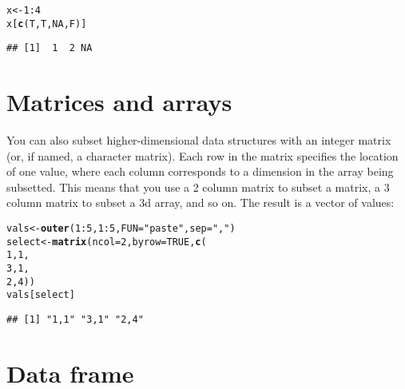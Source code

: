 \documentclass{article}\usepackage[]{graphicx}\usepackage[]{color}
\makeatletter
\newcommand{\hlnum}[1]{\textcolor[rgb]{0.686,0.059,0.569}{#1}}%
\newcommand{\hlstr}[1]{\textcolor[rgb]{0.192,0.494,0.8}{#1}}%
\newcommand{\hlopt}[1]{\textcolor[rgb]{0,0,0}{#1}}%
\newcommand{\hlstd}[1]{\textcolor[rgb]{0.345,0.345,0.345}{#1}}%
\newcommand{\hlkwb}[1]{\textcolor[rgb]{0.69,0.353,0.396}{#1}}%
\newcommand{\hlkwc}[1]{\textcolor[rgb]{0.333,0.667,0.333}{#1}}%
\newcommand{\hlkwd}[1]{\textcolor[rgb]{0.737,0.353,0.396}{\textbf{#1}}}%
\newenvironment{kframe}{%
 \def\at@end@of@kframe{}%
 \ifinner\ifhmode%
  \def\at@end@of@kframe{\end{minipage}}%
  \begin{minipage}{\columnwidth}%
 \fi\fi%
 \def\FrameCommand##1{\hskip\@totalleftmargin \hskip-\fboxsep
 \colorbox{shadecolor}{##1}\hskip-\fboxsep
     \hskip-\linewidth \hskip-\@totalleftmargin \hskip\columnwidth}%
 \MakeFramed {\advance\hsize-\width
   \@totalleftmargin\z@ \linewidth\hsize
   \@setminipage}}%
 {\par\unskip\endMakeFramed%
 \at@end@of@kframe}
\newenvironment{knitrout}{}{} %
\makeatother
\begin{document}
\begin{knitrout}
\color{fgcolor}\begin{kframe}
\begin{alltt}
\hlstd{x} \hlkwb{<-} \hlnum{1}\hlopt{:}\hlnum{4}
\hlstd{x[}\hlkwd{c}\hlstd{(T, T,} \hlnum{NA}\hlstd{, F)]}
\end{alltt}
\begin{verbatim}
## [1]  1  2 NA
\end{verbatim}
\end{kframe}
\end{knitrout}


\section{Matrices and arrays}

You can also subset higher-dimensional data structures with an integer matrix (or, if named, a character matrix). Each row in the matrix specifies the location of one value, where each column corresponds to a dimension in the array being subsetted. This means that you use a 2 column matrix to subset a matrix, a 3 column matrix to subset a 3d array, and so on. The result is a vector of values:

\begin{knitrout}
\color{fgcolor}\begin{kframe}
\begin{alltt}
\hlstd{vals} \hlkwb{<-} \hlkwd{outer}\hlstd{(}\hlnum{1}\hlopt{:}\hlnum{5}\hlstd{,} \hlnum{1}\hlopt{:}\hlnum{5}\hlstd{,} \hlkwc{FUN}\hlstd{=}\hlstr{"paste"}\hlstd{,} \hlkwc{sep}\hlstd{=}\hlstr{","}\hlstd{)}
\hlstd{select} \hlkwb{<-} \hlkwd{matrix}\hlstd{(}\hlkwc{ncol}\hlstd{=}\hlnum{2}\hlstd{,} \hlkwc{byrow}\hlstd{=}\hlnum{TRUE}\hlstd{,} \hlkwd{c}\hlstd{(}
  \hlnum{1}\hlstd{,} \hlnum{1}\hlstd{,}
  \hlnum{3}\hlstd{,} \hlnum{1}\hlstd{,}
  \hlnum{2}\hlstd{,} \hlnum{4}\hlstd{))}
\hlstd{vals[select]}
\end{alltt}
\begin{verbatim}
## [1] "1,1" "3,1" "2,4"
\end{verbatim}
\end{kframe}
\end{knitrout}

\section{Data frame}
\end{document}
